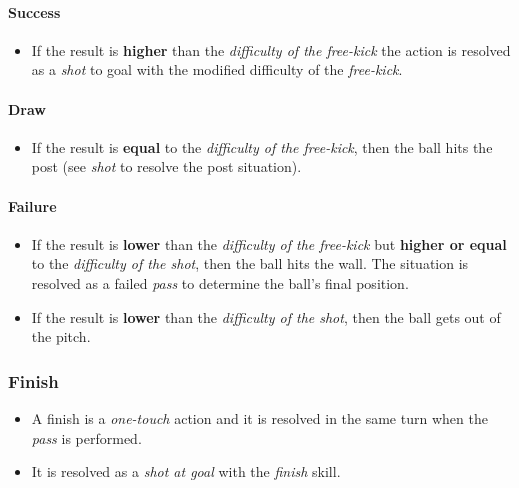 \documentclass[12pt]{article}
\begin{document}
\paragraph{Success}

\begin{rulebox}
\begin{itemize}
\item If the result is \textbf{higher }than the \emph{difficulty of the free-kick} the action is resolved as a \emph{shot }to goal with the modified difficulty of the \emph{free-kick}.
\end{itemize}
\end{rulebox}

\paragraph{Draw}

\begin{rulebox}
\begin{itemize}
\item If the result is \textbf{equal }to the \emph{difficulty of the free-kick}, then the ball hits the post (see \emph{shot }to resolve the post situation).
\end{itemize}
\end{rulebox}

\paragraph{Failure}

\begin{rulebox}
\begin{itemize}
\item If the result is \textbf{lower }than the \emph{difficulty of the free-kick} but \textbf{higher or equal }to the \emph{difficulty of the shot}, then the ball hits the wall. The situation is resolved as a failed \emph{pass} to determine the ball's final position.
\item If the result is \textbf{lower }than the \emph{difficulty of the shot}, then the ball gets out of the pitch.
\end{itemize}
\end{rulebox}

\subsubsection{Finish}
\begin{rulebox}
\begin{itemize}
\item A finish is a \emph{one-touch} action and it is resolved in the same turn when the \emph{pass }is performed.
\item It is resolved as a \emph{shot at goal} with the \emph{finish }skill.
\end{itemize}
\end{rulebox}
\end{document}
